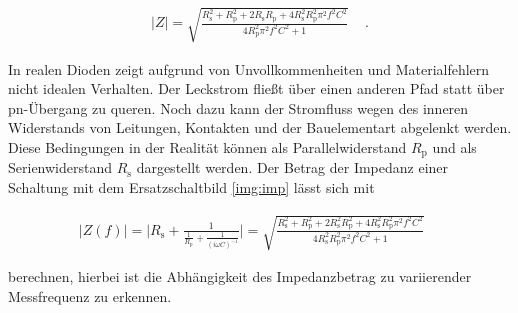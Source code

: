 
\begin{align}
    \label{eq:Impedanz}
    |Z| = \sqrt{\frac{R_\mathrm{s}^2+R_\mathrm{p}^2+2R_\mathrm{s}R_\mathrm{p}+4R_\mathrm{s}^2R_\mathrm{p}^2\pi^2f^2C^2}{4R_\mathrm{p}^2\pi^2f^2C^2+1}} \quad \, .
\end{align}
\cite{SkriptF13}

In realen Dioden zeigt aufgrund von Unvollkommenheiten und Materialfehlern nicht idealen Verhalten. Der Leckstrom fließt über einen anderen Pfad statt über pn-Übergang zu queren. Noch dazu kann der Stromfluss wegen des inneren Widerstands von Leitungen, Kontakten und der Bauelementart abgelenkt werden. Diese Bedingungen in der Realität können als Parallelwiderstand $R_\mathrm{p}$ und als Serienwiderstand $R_\mathrm{s}$ dargestellt werden.
Der Betrag der Impedanz einer Schaltung mit dem Ersatzschaltbild \ref{img:imp} lässt sich mit

\begin{align}
    \label{eq:Impedanz}
    \mid Z(f)\mid=\bigg|  R_\mathrm{s}+\frac{1}{\frac{1}{R_\mathrm{p}}+\frac{1}{(i\omega C)^{-1}}} \bigg| =\sqrt{\frac{R_\mathrm{s}^2+R_\mathrm{p}^2+2R_\mathrm{s}^2R_\mathrm{p}^2+4R_\mathrm{s}^2R_\mathrm{p}^2\pi^2f^2C^2}{4R_\mathrm{s}^2R_\mathrm{p}^2\pi^2f^2C^2+1}} \quad \,
\end{align} 

berechnen, hierbei ist die Abhängigkeit des Impedanzbetrag zu variierender Messfrequenz zu erkennen\cite{SkriptF13}.

